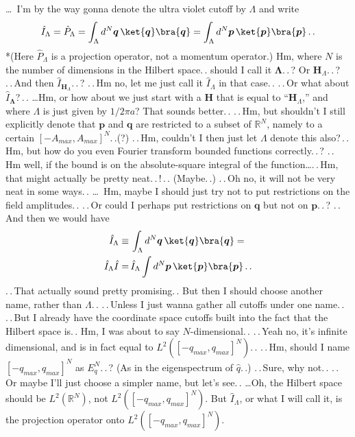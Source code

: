 \documentclass{report}
\begin{document}
\ldots\ I'm by the way gonna denote the ultra violet cutoff by $\Lambda$ and write 
\begin{align}
	\hat I_\Lambda = \hat P_{\Lambda} =
		\int_\Lambda d^N \boldsymbol q\, \ket{\boldsymbol q}\bra{\boldsymbol q} = 
		\int_\Lambda d^N \boldsymbol p\, \ket{\boldsymbol p}\bra{\boldsymbol p}\,.\,.
\end{align}
*(Here $\hat P_\Lambda$ is a projection operator, not a momentum operator.) Hm, where $N$ is the number of dimensions in the Hilbert space.\,. should I call it $\boldsymbol\Lambda$.\,.\,? Or $\mathrm{\textbf{H}}_\Lambda$.\,.\,? .\,.\,And then $\hat I_{\mathrm{\textbf{H}}_\Lambda}$.\,.\,? .\,.\,Hm no, let me just call it $\hat I_\Lambda$ in that case.\,. .\,.\,Or what about $\hat I_{\boldsymbol\Lambda}$?\,.\,. \ldots Hm, or how about we just start with a \textbf{H} that is equal to ``$\mathrm{\textbf{H}}_\Lambda$,'' and where $\Lambda$ is just given by $1/2\pi a$? That sounds better.\,. .\,.\,Hm, but shouldn't I still explicitly denote that $\boldsymbol p$ and $\boldsymbol q$ are restricted to a subset of $\mathbb{R}^N$, namely to a certain $[-A_{max}, A_{max}]^N$.\,.(?) .\,.\,Hm, couldn't I then just let $\Lambda$ denote this also?\,.\,. Hm, but how do you even Fourier transform bounded functions correctly.\,.\,? .\,.\,Hm well, if the bound is on the absolute-square integral of the function\ldots .\,.\,Hm, that might actually be pretty neat.\,.\,!\,.\,. (Maybe.\,.) .\,.\,Oh no, it will not be very neat in some ways.\,. \ldots\ Hm, maybe I should just try not to put restrictions on the field amplitudes.\,. .\,.\,Or could I perhaps put restrictions on $\boldsymbol q$ but not on $\boldsymbol p$.\,.\,? .\,.\,And then we would have
\begin{align}
\begin{aligned}
	\hat I_\Lambda \equiv &\,
		\int_\Lambda d^N \boldsymbol q\, \ket{\boldsymbol q}\bra{\boldsymbol q} = \\
	\hat I_\Lambda \hat I = &\,
		\hat I_\Lambda \int d^N \boldsymbol p\, \ket{\boldsymbol p}\bra{\boldsymbol p}\,.\,.
\end{aligned}
\end{align}
.\,.\,That actually sound pretty promising.\,. But then I should choose another name, rather than $\Lambda$.\,. .\,.\,Unless I just wanna gather all cutoffs under one name.\,. .\,.\,But I already have the coordinate space cutoffs built into the fact that the Hilbert space is.\,. Hm, I was about to say $N$-dimensional.\,. .\,.\,Yeah no, it's infinite dimensional, and is in fact equal to $L^2([-q_{max}, q_{max}]^N)$.\,. .\,.\,Hm, should I name $[-q_{max}, q_{max}]^N$ as $E_q^N$.\,.\,? (As in the eigenspectrum of $\hat q$.\,.) .\,.\,Sure, why not.\,. .\,.\,Or maybe I'll just choose a simpler name, but let's see.\,. \ldots Oh, the Hilbert space should be $L^2(\mathbb{R}^N)$, not $L^2([-q_{max}, q_{max}]^N)$. But $\hat I_\Lambda$, or what I will call it, is the projection operator onto $L^2([-q_{max}, q_{max}]^N)$.
\end{document}
